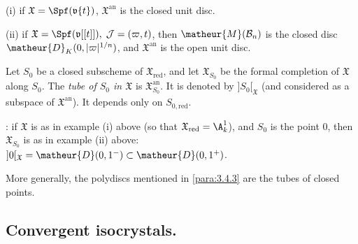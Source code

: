 \begin{exs}\label{para:3.5.2}
 (i) if ${\mathfrak{X}}=\Spf(\mathfrak{v}\{t\})$,
 ${\mathfrak{X}}^{\mathrm{an}}$ is the closed unit disc.
 
 (ii) if ${\mathfrak{X}}=\Spf({\mathfrak{v}[[t]]}),
 \;\mathcal{J}=(\varpi, t)$, then $\matheur{M}(\mathcal{B}_n)$ is the 
 closed disc $\matheur{D}_K(0,|\varpi|^{1/n})$, and
 ${\mathfrak{X}}^{\mathrm{an}}$ is the open unit disc. 
\end{exs}

\begin{para}\label{para:3.5.3} Let $S_0$ be a closed subscheme of
$\mathfrak{X}_{\mathrm{red}}$, and let ${\mathfrak{X}}_{S_0}$ be the formal
completion of $\mathfrak{X}$ along $S_0$. The {\it tube of $S_0$ in
$\mathfrak{X}$} is $\mathfrak{X}_{S_0}^{\mathrm{an}}$. It is denoted by
$]S_0[_{\mathfrak{X}}$ (and considered as a subspace of
$\mathfrak{X}^{\mathrm{an}}$). It depends only on $S_{0,\mathrm{red}}$.  

\medskip
 : if $\mathfrak{X}$ is as in example (i) above
 (so that $\mathfrak{X}_{\mathrm{red}}=\A^1_k$), and $S_0$ is the point $0$,
 then $\mathfrak{X}_{S_0}$ is as in example (ii) above:
 $]0[_{\mathfrak{X}}\;=\matheur{D}(0,1^-)\subset \matheur{D}(0,1^+)$. 

 \noindent More generally, the polydiscs mentioned in \ref{para:3.4.3}
 are the tubes of closed points.
\end{para}


\subsection{Convergent isocrystals.}\label{sub:3.6}     

